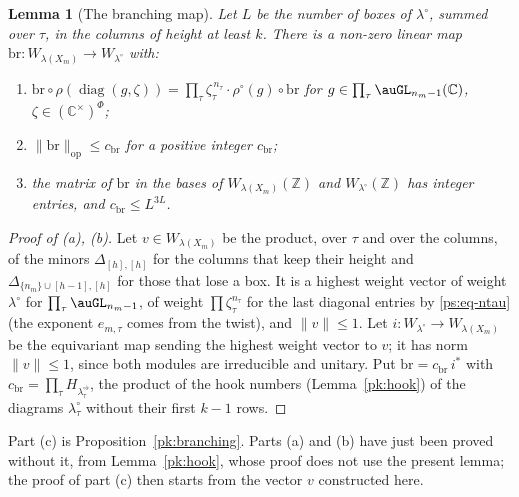 \documentclass[10pt]{amsart}
\newtheorem{lemma}[theorem]{Lemma}
\theoremstyle{definition}
\theoremstyle{remark}
\newcommand{\C}{\mathbb C}
\newcommand{\Z}{\mathbb Z}
\providecommand{\auPl}{\Phi}
\begin{document}
\begin{lemma}[The branching map]\label{ps:branching}
Let $L$ be the number of boxes of $\lambda^\circ$, summed over $\tau$, in the columns of height at
least $k$. There is a non-zero linear map $\mathrm{br}\colon W_{\lambda(X_m)}\to W_{\lambda^\circ}$
with:
\begin{enumerate}
\item[(a)] $\mathrm{br}\circ\rho(\operatorname{diag}(g,\zeta))=\prod_\tau\zeta_\tau^{\,n_\tau}\cdot
\rho^\circ(g)\circ\mathrm{br}$ for $g\in\prod_\tau\auGL_{n_m-1}(\C)$, $\zeta\in(\C^\times)^{\auPl}$;
\item[(b)] $\|\mathrm{br}\|_{\mathrm{op}}\le c_{\mathrm{br}}$ for a positive integer
$c_{\mathrm{br}}$;
\item[(c)] the matrix of $\mathrm{br}$ in the bases of $W_{\lambda(X_m)}(\Z)$ and
$W_{\lambda^\circ}(\Z)$ has integer entries, and $c_{\mathrm{br}}\le L^{3L}$.
\end{enumerate}
\end{lemma}
\begin{proof}[Proof of (a), (b)]
Let $v\in W_{\lambda(X_m)}$ be the product, over $\tau$ and over the columns, of the minors
$\Delta_{[h],[h]}$ for the columns that keep their height and $\Delta_{\{n_m\}\cup[h-1],[h]}$ for
those that lose a box. It is a highest weight vector of weight $\lambda^\circ$ for
$\prod_\tau\auGL_{n_m-1}$, of weight $\prod\zeta_\tau^{n_\tau}$ for the last diagonal entries by
\eqref{ps:eq-ntau} (the exponent $e_{m,\tau}$ comes from the twist), and $\|v\|\le1$. Let
$i\colon W_{\lambda^\circ}\to W_{\lambda(X_m)}$ be the equivariant map sending the highest weight
vector to $v$; it has norm $\|v\|\le1$, since both modules are irreducible and unitary. Put
$\mathrm{br}=c_{\mathrm{br}}\,i^*$ with $c_{\mathrm{br}}=\prod_\tau H_{\lambda^{\circ\flat}_\tau}$,
the product of the hook numbers (Lemma~\ref{pk:hook}) of the diagrams $\lambda^\circ_\tau$ without
their first $k-1$ rows.
\end{proof}
\noindent Part (c) is Proposition~\ref{pk:branching}. Parts (a) and (b) have just been proved without it, from Lemma~\ref{pk:hook}, whose proof does not use the present lemma; the proof of part (c) then starts from the vector $v$ constructed here.
\end{document}
